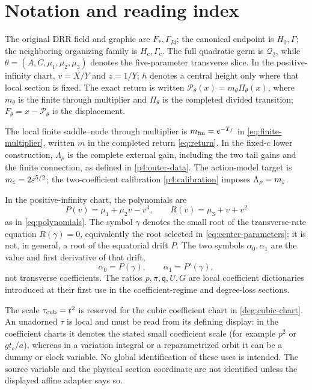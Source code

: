 \section{Notation and reading index}
\label{app:notation-index}

The original DRR field and graphic are \(F_*,\Gamma_{I4}\);
the canonical endpoint is \(H_0,\Gamma\); the
neighboring organizing family is \(H_c,\Gamma_c\). The full quadratic germ is
\(\mathcal Q_2\), while \(\theta=(A,C,\mu_1,\mu_2,\mu_3)\) denotes the
five-parameter transverse slice. In the positive-infinity chart,
\(v=X/Y\) and \(z=1/Y\); \(h\) denotes a central height only where that
local section is fixed. The exact return is written
\(\mathcal P_\theta(x)=m_\theta\Pi_\theta(x)\), where \(m_\theta\) is the
finite through multiplier and \(\Pi_\theta\) is the completed divided
transition; \(F_\theta=x-\mathcal P_\theta\) is the displacement.

The local finite saddle--node through multiplier is
\(m_{\rm fin}=e^{-T_f}\) in \eqref{eq:finite-multiplier}, written \(m\)
in the completed return \eqref{eq:return}. In the fixed-\(c\) lower construction,
\(\Lambda_\rho\) is the complete external gain, including the two tail
gains and the finite connection, as defined in \eqref{p4:outer-data}.
The action-model target is \(m_\varepsilon=2\varepsilon^{5/2}\); the two-coefficient
calibration \eqref{p4:calibration} imposes \(\Lambda_\rho=m_\varepsilon\).

In the positive-infinity chart, the polynomials are
\[
 P(v)=\mu _1+\mu _2v-v^3,\qquad
 R(v)=\mu _3+v+v^2
\]
as in \eqref{eq:polynomials}.  The symbol \(\gamma\) denotes the small
root of the transverse-rate equation \(R(\gamma)=0\), equivalently the
root selected in \eqref{eq:center-parameters}; it is not, in general, a
root of the equatorial drift \(P\).  The two symbols
\(\alpha _0,\alpha _1\) are the value and first derivative of that drift,
\[
 \alpha _0=P(\gamma),\qquad \alpha _1=P'(\gamma),
\]
not transverse coefficients.  The ratios \(p,\pi,\mathfrak q,U,G\) are
local coefficient dictionaries introduced at their first use in the
coefficient-regime and degree-loss sections.

The scale \(\tau_{\rm cub}=t^2\) is reserved for the cubic coefficient chart in
\eqref{deg:cubic-chart}.  An unadorned \(\tau\) is local and must be read
from its defining display: in the coefficient charts it denotes the stated
small coefficient scale (for example \(p^2\) or \(gt_c/a\)), whereas in a
variation integral or a reparametrized orbit it can be a dummy or clock
variable.  No global identification of these uses is intended.  The source
variable and the physical section coordinate are not identified unless the
displayed affine adapter says so.

